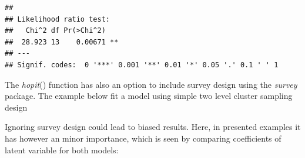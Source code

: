 \documentclass[]{article}
\newenvironment{Shaded}{\begin{snugshade}}{\end{snugshade}}
\newcommand{\DataTypeTok}[1]{\textcolor[rgb]{0.13,0.29,0.53}{#1}}
\newcommand{\KeywordTok}[1]{\textcolor[rgb]{0.13,0.29,0.53}{\textbf{#1}}}
\newcommand{\NormalTok}[1]{#1}
\newcommand{\OperatorTok}[1]{\textcolor[rgb]{0.81,0.36,0.00}{\textbf{#1}}}
\newcommand{\OtherTok}[1]{\textcolor[rgb]{0.56,0.35,0.01}{#1}}
\newcommand{\StringTok}[1]{\textcolor[rgb]{0.31,0.60,0.02}{#1}}
\begin{document}
\begin{verbatim}
## 
## Likelihood ratio test:
##   Chi^2 df Pr(>Chi^2)   
##  28.923 13    0.00671 **
## ---
## Signif. codes:  0 '***' 0.001 '**' 0.01 '*' 0.05 '.' 0.1 ' ' 1
\end{verbatim}

The \emph{hopit}() function has also an option to include survey design
using the \emph{survey} package. The example below fit a model using
simple two level cluster sampling design

\begin{Shaded}
\end{Shaded}

Ignoring survey design could lead to biased results. Here, in presented
examples it has however an minor importance, which is seen by comparing
coefficients of latent variable for both models:
\end{document}
